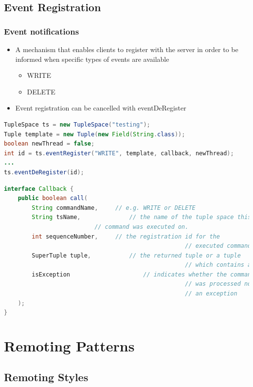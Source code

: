 \documentclass[10pt]{article}
\begin{document}
\subsection{Event Registration}
\subsubsection{Event notifications}
\begin{itemize}
	\item A mechanism that enables clients to register with the server in order to be informed when specific types of events are available
		\begin{itemize}
			\item WRITE
			\item DELETE
		\end{itemize}
	\item Event registration can be cancelled with eventDeRegister
\end{itemize}
\begin{lstlisting}[language=Java, caption=Event notifications Example, style=JavaStyle]
TupleSpace ts = new TupleSpace("testing");
Tuple template = new Tuple(new Field(String.class));
boolean newThread = false;
int id = ts.eventRegister("WRITE", template, callback, newThread);
...
ts.eventDeRegister(id);
\end{lstlisting}
\begin{lstlisting}[language=Java, caption=Callback interface, style=JavaStyle]
interface Callback {
	public boolean call(
		String commandName, 	// e.g. WRITE or DELETE
		String tsName, 				// the name of the tuple space this
                          // command was executed on.
		int sequenceNumber,		// the registration id for the
													// executed command
		SuperTuple tuple,			// the returned tuple or a tuple
													// which contains an exception boolean 
		isException 					// indicates whether the command
													// was processed normally or with
													// an exception
	);
}
\end{lstlisting}

\newpage
\section{Remoting Patterns}
\subsection{Remoting Styles}
\end{document}
